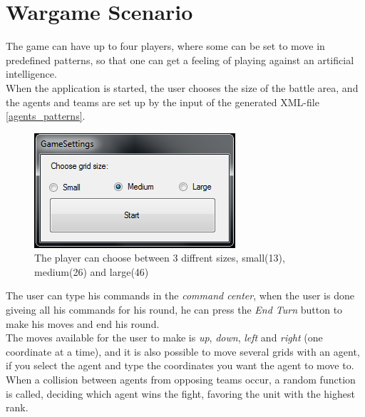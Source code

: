 \chapter{Wargame Scenario}
\label{sec:wargame}

The game can have up to four players, where some can be set to move in predefined patterns, so that one can get a feeling of playing against an artificial intelligence.\\ \indent
	When the application is started, the user chooses the size of the battle area, and the agents and teams are set up by the input of the generated XML-file \ref{agents_patterns}.

\begin{figure}[H]
\begin{center}
\includegraphics{Images/settings.png}
\end{center}
\caption{The player can choose between 3 diffrent sizes, small(13), medium(26) and large(46)}
\label{fig:settings}
\end{figure}

The user can type his commands in the \textit{command center}, when the user is done giveing all his commands for his round, he can press the \textit{End Turn} button to make his moves and end his round.\\ \indent
	The moves available for the user to make is \textit{up}, \textit{down}, \textit{left} and \textit{right} (one coordinate at a time), and it is also possible to move several grids with an agent, if you select the agent and type the coordinates you want the agent to move to.\\ \indent
  When a collision between agents from opposing teams occur, a random function is called, deciding which agent wins the fight, favoring the unit with the highest rank.
	
